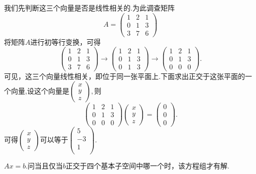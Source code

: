﻿\documentclass{book} \usepackage{exsheets} \usepackage{xeCJK}
\begin{document}
\begin{solution}
  我们先判断这三个向量是否是线性相关的.为此调查矩阵
$$
A=
\begin{pmatrix}
  1&2&1\\
  0&1&3\\
  3&7&6
\end{pmatrix}
$$
将矩阵$A$进行初等行变换，可得
$$
\begin{pmatrix}
  1&2&1\\
  0&1&3\\
  3&7&6
\end{pmatrix}\to
\begin{pmatrix}
  1&2&1\\
  0&1&3\\
  0&1&3
\end{pmatrix}\to
\begin{pmatrix}
  1&2&1\\
  0&1&3\\
  0&0&0
\end{pmatrix}.
$$
可见，这三个向量线性相关，即位于同一张平面上.下面求出正交于这张平面的一
个向量,设这个向量是$
\begin{pmatrix}
  x\\
  y\\
  z
\end{pmatrix}, $则
$$
\begin{pmatrix}
  1&2&1\\
  0&1&3\\
  0&0&0
\end{pmatrix}
\begin{pmatrix}
  x\\
  y\\
  z
\end{pmatrix}=
\begin{pmatrix}
  0\\
  0\\
  0
\end{pmatrix}.
$$
可得$
\begin{pmatrix}
  x\\
  y\\
  z
\end{pmatrix}
$可以等于$
\begin{pmatrix}
  5\\
  -3\\
  1\\
\end{pmatrix}.  $
\end{solution}
\begin{question}
  $Ax=b$.问当且仅当$b$正交于四个基本子空间中哪一个时，该方程组才有解.
\end{question}
\end{document}
